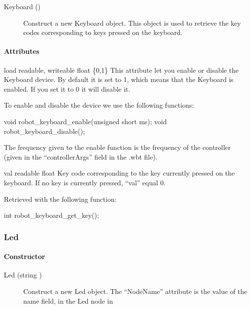 \noindent
\begin{description}
\item[{Keyboard ()}] Construct a new Keyboard object. This object is
  used to retrieve the key codes corresponding to keys pressed on the
  keyboard.
\end{description}

\paragraph{Attributes}

\noindent
\begin{itemize}
\begin{attribute}{load}
  {readable, writeable}
  {float}
  {\{0,1\}}
  This attribute let you enable or disable the Keyboard
  device.  By default it is set to 1, which means that the Keyboard is
  enabled. If you set it to 0 it will disable it.


  To enable and disable the device we use the following \webots functions:
\begin{cxx}
void robot_keyboard_enable(unsigned short ms);
void robot_keyboard_disable();
\end{cxx}

The frequency given to the enable function is the frequency of the
\urbi controller (given in the ``controllerArgs'' field in the .wbt
file).
\end{attribute}

\begin{attribute}{val}
  {readable}
  {float}
  {}
  Key code corresponding to the key currently pressed on
  the keyboard. If no key is currently pressed, ``val'' equal 0.

  Retrieved with the following \webots function:
\begin{cxx}
int robot_keyboard_get_key();
\end{cxx}
\end{attribute}
\end{itemize}

\subsubsection{Led}

\paragraph{Constructor}

\begin{description}
\item[{Led (string )}] Construct a new Led object. The
  ``NodeName'' attribute is the value of the name field, in the Led
  node in \webots
\end{description}


